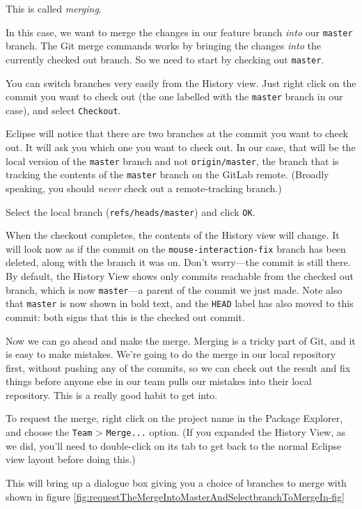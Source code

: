 \documentclass[
]{book}
\begin{document}
This is called \emph{merging}.

In this case, we want to merge the changes in our feature branch \emph{into} our \texttt{master} branch. The Git merge commands works by bringing the changes \emph{into} the currently checked out branch. So we need to start by checking out \texttt{master}.

You can switch branches very easily from the History view. Just right click on the commit you want to check out (the one labelled with the \texttt{master} branch in our case), and select \texttt{Checkout}.

Eclipse will notice that there are two branches at the commit you want to check out. It will ask you which one you want to check out. In our case, that will be the local version of the \texttt{master} branch and not \texttt{origin/master}, the branch that is tracking the contents of the \texttt{master} branch on the GitLab remote. (Broadly speaking, you should \emph{never} check out a remote-tracking branch.)

Select the local branch (\texttt{refs/heads/master}) and click \texttt{OK}.

When the checkout completes, the contents of the History view will change. It will look now as if the commit on the \texttt{mouse-interaction-fix} branch has been deleted, along with the branch it was on. Don't worry---the commit is still there. By default, the History View shows only commits reachable from the checked out branch, which is now \texttt{master}---a parent of the commit we just made. Note also that \texttt{master} is now shown in bold text, and the \texttt{HEAD} label has also moved to this commit: both signs that this is the checked out commit.

Now we can go ahead and make the merge. Merging is a tricky part of Git, and it is easy to make mistakes. We're going to do the merge in our local repository first, without pushing any of the commits, so we can check out the result and fix things before anyone else in our team pulls our mistakes into their local repository. This is a really good habit to get into.

To request the merge, right click on the project name in the Package Explorer, and choose the \texttt{Team} \textgreater{} \texttt{Merge...} option. (If you expanded the History View, as we did, you'll need to double-click on its tab to get back to the normal Eclipse view layout before doing this.)

This will bring up a dialogue box giving you a choice of branches to merge with shown in figure \ref{fig:requestTheMergeIntoMasterAndSelectbranchToMergeIn-fig}
\end{document}
